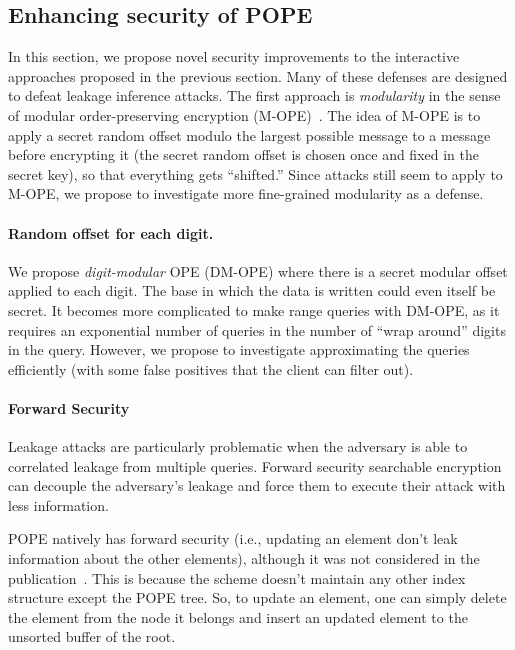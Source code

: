 
\subsection{Enhancing security of POPE}
In this section, we propose novel security improvements to the interactive approaches proposed in the previous section.  Many of these defenses are designed to defeat leakage inference attacks.  The first approach is \emph{modularity} in the
sense of modular order-preserving encryption (M-OPE)~\cite{C:BolCheONe11}.  The
idea of M-OPE is to apply a secret random offset modulo the largest possible
message to a message before encrypting it (the secret random offset is chosen
once and fixed in the secret key), so that everything gets ``shifted.''
Since attacks still seem to apply to M-OPE, we propose to investigate more
fine-grained modularity as a defense. 

\paragraph{Random offset for each digit.}
We propose \emph{digit-modular} OPE (DM-OPE) where there is a
secret modular offset applied to each digit.  The base in which the data is
written could even itself be secret.  It becomes more complicated to make range
queries with DM-OPE, as it requires an exponential number of queries in the
number of ``wrap around'' digits in the query.  However, we propose to
investigate approximating the queries efficiently (with some false positives
that the client can filter out).

\paragraph{Forward Security} Leakage attacks are particularly problematic when the adversary is able to correlated leakage from multiple queries.  Forward security searchable encryption can decouple the adversary's leakage and force them to execute their attack with less information.  

POPE natively has forward security (i.e., updating an element
don't leak information about the other elements), although it was not considered in the publication~\cite{CCS:RACY16}.  This is because the scheme doesn't maintain any other
index structure except the POPE tree. So, to update an element, one can simply
delete the element from the node it belongs and insert an updated element to
the unsorted buffer of the root. 

